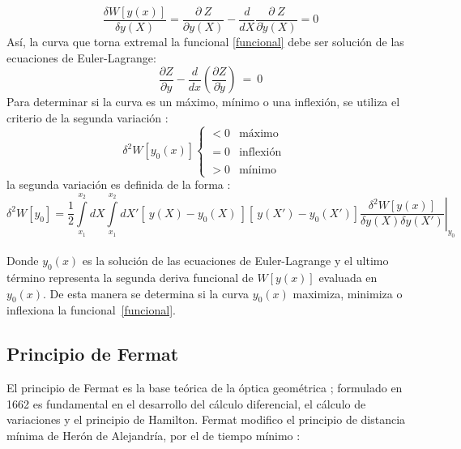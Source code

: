 \documentclass[a4paper,12pt]{article}
\begin{document}
\begin{equation}
\frac{\delta W[y(x)]}{\delta y(X)}=\frac{\partial \ Z}{\partial y(X)}-\frac{d }{d X}\frac{\partial \ Z}{\partial \dot y(X)}=0 
\end{equation}
Así, la curva que torna extremal la funcional \eqref{funcional} debe ser solución de las ecuaciones de Euler-Lagrange: 
\begin{equation}
\frac{\partial Z}{\partial y}-\frac{d}{dx}\left( \frac{\partial Z}{\partial \dot y}\right)\ =\ 0 
\label{eula}
\end{equation}
Para determinar si la curva es un máximo, mínimo o una inflexión, se utiliza el criterio de la segunda variación \cite{funcional}:
\begin{equation}
\delta^2 W[y_0(x)]\left\{ \begin{array}{lcl}
<0 & \mbox{máximo }\\
&
&
\\
=0 & \mbox{inflexión } 
&
\\
\\
>0 & \mbox{mínimo } 

\end{array}
\right.
\end{equation}
la segunda variación es definida de la forma \cite{funcional}:
{\small
\begin{equation}
\delta^2 W[y_0]= \frac{1}{2}\int\limits_{x_1}^{x_2}dX\int\limits_{x_1}^{x_2}dX'\left[\ y(X)-y_0(X)\ \right]\left[\ y(X')-y_0(X') \right]\left.\frac{\delta^2 W[y(x)] }{\delta y(X)\delta y (X')}\right|_{y_0}
\end{equation}}\\
Donde $y_0(x)$ es la solución de las ecuaciones de Euler-Lagrange y el ultimo término representa la segunda deriva funcional de $W[y(x)]$ evaluada en $y_0(x)$. De esta manera se determina si la curva $y_0(x)$ maximiza, minimiza o inflexiona la \mbox{funcional \eqref{funcional}.}    
\subsection{Principio de Fermat}
El principio de Fermat es la base teórica de la óptica geométrica \cite{ecudif,fin2,feyman}; formulado en 1662 es \mbox{fundamental} en el desarrollo del cálculo diferencial, el cálculo de variaciones y el principio de Hamilton. Fermat modifico el principio de distancia mínima de Herón de Alejandría, por el de tiempo mínimo \cite{ecudif,fin2,feyman}:
\\
\end{document}
